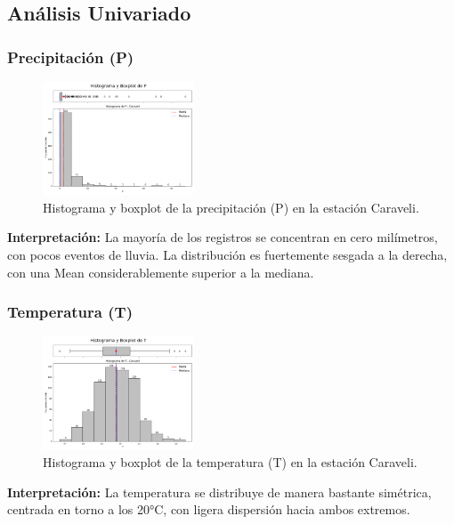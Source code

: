 \subsection{Análisis Univariado}

\subsubsection*{Precipitación (P)}
\begin{figure}[H]
\centering
\includegraphics[width=0.4\textwidth]{resultados/por_estacion_meteorologica/Caraveli/P_histograma.png}
\caption{Histograma y boxplot de la precipitación (P) en la estación Caraveli.}
\label{fig:caraveli_P}
\end{figure}
\textbf{Interpretación:} La mayoría de los registros se concentran en cero milímetros, con pocos eventos de lluvia. La distribución es fuertemente sesgada a la derecha, con una Mean considerablemente superior a la mediana.

\subsubsection*{Temperatura (T)}
\begin{figure}[H]
\centering
\includegraphics[width=0.4\textwidth]{resultados/por_estacion_meteorologica/Caraveli/T_histograma.png}
\caption{Histograma y boxplot de la temperatura (T) en la estación Caraveli.}
\label{fig:caraveli_T}
\end{figure}
\textbf{Interpretación:} La temperatura se distribuye de manera bastante simétrica, centrada en torno a los 20°C, con ligera dispersión hacia ambos extremos.

